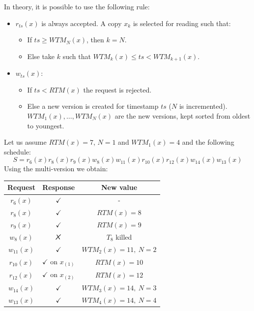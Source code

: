 \documentclass[12pt, a4paper]{report}
\newtheorem[style=M,bodystyle=\normalfont]{theorem}{Theorem}
\newtheorem[style=M,bodystyle=\normalfont]{corollary}{Corollary}
\newtheorem[style=M,bodystyle=\normalfont]{lemma}{Lemma}
\newtheorem[style=M,bodystyle=\normalfont]{definition}{Definition}
\newcommand{\tikzxmark}{%
\tikz[scale=0.23] {
    \draw[line width=0.7,line cap=round] (0,0) to [bend left=6] (1,1);
    \draw[line width=0.7,line cap=round] (0.2,0.95) to [bend right=3] (0.8,0.05);
}}
\begin{document}
    In theory, it is possible to use the following rule: 
    \begin{itemize}
        \item $r_{ts}(x)$ is always accepted. A copy $x_k$ is selected for reading such that:
            \begin{itemize}
                \item If $ts \geq WTM_N(x)$, then $k=N$.
                \item Else take $k$ such that $WTM_k(x) \leq ts < WTM_{k+1}(x)$. 
            \end{itemize}
        \item $w_{ts}(x)$: 
            \begin{itemize}
                \item If $ts < RTM(x)$ the request is rejected. 
                \item Else a new version is created for timestamp $ts$ ($N$ is incremented). $WTM_1(x), \dots, WTM_N(x)$ are the new versions, kept sorted from oldest to youngest.
            \end{itemize}
    \end{itemize}
    \begin{example}
        Let us assume $RTM(x)=7$, $N=1$ and $WTM_1(x)=4$ and the following schedule: 
        \[S=r_6(x) r_8(x) r_9(x) w_8(x) w_{11}(x) r_{10}(x) r_{12}(x) w_{14}(x) w_{13}(x)\]
        Using the multi-version we obtain: 
        \begin{table}[H]
            \centering
            \begin{tabular}{ccc}
            \textbf{Request} & \textbf{Response}         & \textbf{New value}  \\ \hline
            $r_6(x)$         & $\checkmark$              & -                   \\
            $r_8(x)$         & $\checkmark$              & $RTM(x)=8$          \\
            $r_9(x)$         & $\checkmark$              & $RTM(x)=9$          \\
            $w_8(x)$         & $\tikzxmark$              & $T_8$ killed        \\
            $w_{11}(x)$      & $\checkmark$              & $WTM_2(x)=11,\:N=2$ \\
            $r_{10}(x)$      & $\checkmark$ on $x_{(1)}$ & $RTM(x)=10$         \\
            $r_{12}(x)$      & $\checkmark$ on $x_{(2)}$ & $RTM(x)=12$         \\
            $w_{14}(x)$      & $\checkmark$              & $WTM_3(x)=14,\:N=3$ \\
            $w_{13}(x)$      & $\checkmark$              & $WTM_4(x)=14,\:N=4$
            \end{tabular}
        \end{table}
    \end{example}
\end{document}
